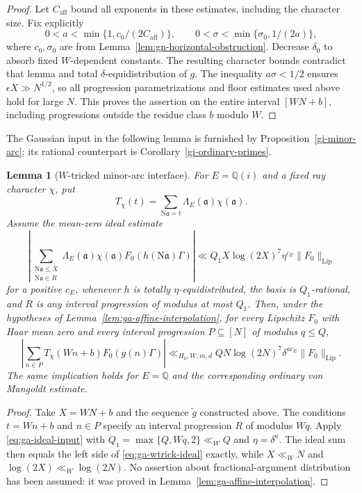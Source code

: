 \documentclass[11pt]{article}
\newtheorem{lemma}[theorem]{Lemma}
\theoremstyle{definition}
\theoremstyle{remark}
\begin{document}
\begin{proof}
Let $C_{\mathrm{aff}}$ bound all exponents in these estimates, including
the character size. Fix explicitly
\[
 0<a<\min\{1,c_0/(2C_{\mathrm{aff}})\},\qquad
 0<\sigma<\min\{\sigma_0,1/(2a)\},
\]
where $c_0,\sigma_0$ are from
Lemma~\ref{lem:gn-horizontal-obstruction}. Decrease $\delta_0$ to
absorb fixed $W$-dependent constants. The resulting character bounds
contradict that lemma and total $\delta$-equidistribution of $g$.
The inequality $a\sigma<1/2$ ensures $\epsilon X\gg N^{1/2}$, so all
progression parametrizations and floor estimates used above hold for
large $N$. This proves the assertion on the entire interval $[WN+b]$,
including progressions outside the residue class $b$ modulo $W$.
\end{proof}

The Gaussian input in the following lemma is furnished by
Proposition~\ref{gi-minor-arc}; its rational counterpart is
Corollary~\ref{gi-ordinary-primes}.

\begin{lemma}[$W$-tricked minor-arc interface]\label{lem:ga-wtrick-ma}
For $E=\mathbb Q(i)$ and a fixed ray character $\chi$, put
\[
 T_\chi(t)=\sum_{\mathrm N\mathfrak a=t}
             \Lambda_E(\mathfrak a)\chi(\mathfrak a).
\]
Assume the mean-zero ideal estimate
\begin{equation}\label{eq:ga-ideal-input}
 \left|\sum_{\substack{\mathrm N\mathfrak a\leq X\\
                          \mathrm N\mathfrak a\in R}}
  \Lambda_E(\mathfrak a)\chi(\mathfrak a)
             F_0(h(\mathrm N\mathfrak a)\Gamma)\right|
 \ll Q_1X\log(2X)^7\eta^{c_E}\|F_0\|_{\mathrm{Lip}}
\end{equation}
for a positive $c_E$, whenever $h$ is totally $\eta$-equidistributed,
the basis is $Q_1$-rational, and $R$ is any interval progression of
modulus at most $Q_1$. Then, under the hypotheses of
Lemma~\ref{lem:ga-affine-interpolation}, for every Lipschitz $F_0$
with Haar mean zero and every interval progression
$P\subseteq[N]$ of modulus $q\leq Q$,
\begin{equation}\label{eq:ga-wtrick-ideal}
 \left|\sum_{n\in P}T_\chi(Wn+b)F_0(g(n)\Gamma)\right|
 \ll_{H_0,W,m,d}QN\log(2N)^7\delta^{ac_E}
                     \|F_0\|_{\mathrm{Lip}}.
\end{equation}
The same implication holds for $E=\mathbb Q$ and the corresponding
ordinary von Mangoldt estimate.
\end{lemma}
\begin{proof}
Take $X=WN+b$ and the sequence $\widetilde g$ constructed above. The
conditions $t=Wn+b$ and $n\in P$ specify an interval progression $R$
of modulus $Wq$. Apply \eqref{eq:ga-ideal-input} with
$Q_1=\max\{Q,Wq,2\}\ll_WQ$ and $\eta=\delta^a$. The ideal sum
then equals the left side of \eqref{eq:ga-wtrick-ideal} exactly, while
$X\ll_WN$ and $\log(2X)\ll_W\log(2N)$. No assertion about
fractional-argument distribution has been assumed: it was proved in
Lemma~\ref{lem:ga-affine-interpolation}.
\end{proof}
\end{document}

